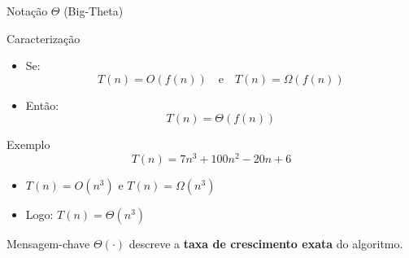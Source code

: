 \documentclass{beamer}
\begin{document}
\begin{frame}{Notação $\Theta$ (Big-Theta)}

\begin{block}{Caracterização}
\begin{itemize}
    \item Se:
    \[
    T(n) = O(f(n)) \quad \text{e} \quad T(n) = \Omega(f(n))
    \]
    \item Então:
    \[
    T(n) = \Theta(f(n))
    \]
\end{itemize}
\end{block}

\vspace{0.2cm}

\begin{block}{Exemplo}
\[
T(n) = 7n^3 + 100n^2 - 20n + 6
\]

\begin{itemize}
    \item $T(n) = O(n^3)$ e $T(n) = \Omega(n^3)$
    \item Logo: $T(n) = \Theta(n^3)$
\end{itemize}
\end{block}

\vspace{0.2cm}

\begin{alertblock}{Mensagem-chave}
$\Theta(\cdot)$ descreve a \textbf{taxa de crescimento exata} do algoritmo.
\end{alertblock}

\end{frame}
\end{document}
